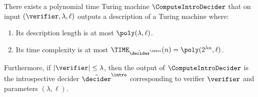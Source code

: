 \begin{lemma}
  \label{lem:intro-decider-complexity}
  There exists a polynomial time Turing machine $\ComputeIntroDecider$ that
  on input $(\verifier, \lambda, \ell)$ outputs a description of a Turing machine where:
  \begin{enumerate}
  		\item   {} Its description length is at most $\poly(\lambda, \ell)$.
		\item Its time complexity is at most $\TIME_{\tdint}(n) = \poly(2^{\lambda n} , \ell)$.
  \end{enumerate}
  Furthermore, if $|\verifier| \leq \lambda$, then the output of $\ComputeIntroDecider$ is the introspective decider 
  $\tdint$ corresponding to verifier $\verifier$ and parameters $(\lambda,\ell)$. 
\end{lemma}

